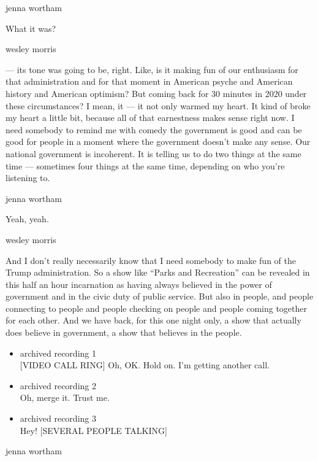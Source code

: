 jenna wortham

What it was?

wesley morris

--- its tone was going to be, right. Like, is it making fun of our
enthusiasm for that administration and for that moment in American
psyche and American history and American optimism? But coming back for
30 minutes in 2020 under these circumstances? I mean, it --- it not only
warmed my heart. It kind of broke my heart a little bit, because all of
that earnestness makes sense right now. I need somebody to remind me
with comedy the government is good and can be good for people in a
moment where the government doesn't make any sense. Our national
government is incoherent. It is telling us to do two things at the same
time --- sometimes four things at the same time, depending on who you're
listening to.

jenna wortham

Yeah, yeah.

wesley morris

And I don't really necessarily know that I need somebody to make fun of
the Trump administration. So a show like ``Parks and Recreation'' can be
revealed in this half an hour incarnation as having always believed in
the power of government and in the civic duty of public service. But
also in people, and people connecting to people and people checking on
people and people coming together for each other. And we have back, for
this one night only, a show that actually does believe in government, a
show that believes in the people.

\begin{itemize}
\item
  archived recording 1\\
  {[}VIDEO CALL RING{]} Oh, OK. Hold on. I'm getting another call.
\item
  archived recording 2\\
  Oh, merge it. Trust me.
\item
  archived recording 3\\
  Hey! {[}SEVERAL PEOPLE TALKING{]}
\end{itemize}

jenna wortham


